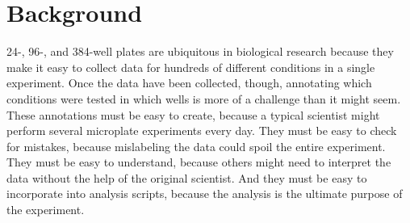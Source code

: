 \documentclass{bmcart}
\begin{document}

\section*{Background}

24-, 96-, and 384-well plates are ubiquitous in biological research because
they make it easy to collect data for hundreds of different conditions in a
single experiment. Once the data have been collected, though, annotating which
conditions were tested in which wells is more of a challenge than it might
seem. These annotations must be easy to create, because a typical scientist
might perform several microplate experiments every day. They must be easy to
check for mistakes, because mislabeling the data could spoil the entire
experiment. They must be easy to understand, because others might need to
interpret the data without the help of the original scientist. And they must be
easy to incorporate into analysis scripts, because the analysis is the ultimate
purpose of the experiment.
\end{document}
